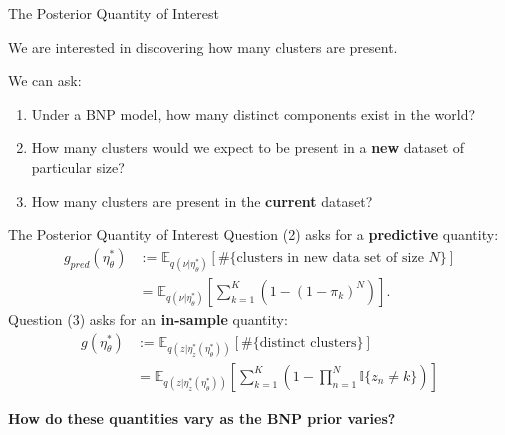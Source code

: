 \documentclass[10pt]{beamer}\usepackage[]{graphicx}\usepackage[]{color}
\newcommand{\Expect}{\mathbb{E}}
\newcommand{\etazopt}{\eta_z^{*}}
\newcommand{\etathetaopt}{\eta_\theta^{*}}
\begin{document}
\begin{frame}{The Posterior Quantity of Interest}

We are interested in discovering how many clusters are present. 

\pause
We can ask: 
\begin{enumerate}[(1)]
\item Under a BNP model, how many distinct components exist in the world? 
\pause
\item How many clusters would we expect to be present in a {\bf new} dataset of particular size?
\pause
\item How many clusters are present in the {\bf current} dataset?
\end{enumerate}

\end{frame}

\begin{frame}{The Posterior Quantity of Interest}
Question (2) asks for a {\bf predictive} quantity: 
\begin{align*}
g_{pred}(\etathetaopt) &:=
\Expect_{q(\nu \vert \etathetaopt)} \left[\#\{\text{clusters in new data set of size $N$}\} \right]  \\
&=
\Expect_{q(\nu \vert \etathetaopt)} \left[\sum_{k=1}^K \left(1 - (1 - \pi_k)^{N}\right)\right].
\end{align*}
%
\pause 
%
Question (3) asks for an {\bf in-sample} quantity: 
\begin{align*}
g(\etathetaopt) &:=
\Expect_{q(z \vert \etazopt(\etathetaopt))} \left[ \#\{\text{distinct clusters}\} \right]  \\
&=
\Expect_{q(z \vert \etazopt(\etathetaopt))} \left[
    \sum_{k=1}^K \left(1 - \prod_{n=1}^N \mathbb{I}\{z_n \ne k\} \right)
    \right]
\end{align*}
%
\pause\vspace{-0.1in}
%
\begin{mdframed}[style=MyFrame]
\begin{center}
{\bf How do these quantities vary as the BNP prior varies? }
\end{center}
\end{mdframed}

\end{frame}
\end{document}
